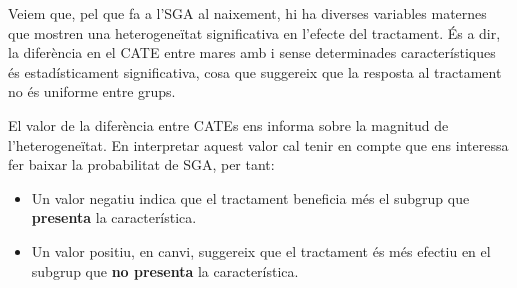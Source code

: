 \documentclass[../main.tex]{subfiles}
\begin{document}
    Veiem que, pel que fa a l’SGA al naixement, hi ha diverses variables maternes que mostren una heterogeneïtat significativa en l’efecte del tractament. És a dir, la diferència en el CATE entre mares amb i sense determinades característiques és estadísticament significativa, cosa que suggereix que la resposta al tractament no és uniforme entre grups. \par
    El valor de la diferència entre CATEs ens informa sobre la magnitud de l’heterogeneïtat. En interpretar aquest valor cal tenir en compte que ens interessa fer baixar la probabilitat de SGA, per tant:
    \begin{itemize}
        \item Un valor negatiu indica que el tractament beneficia més el subgrup que \textbf{presenta} la característica.
        \item Un valor positiu, en canvi, suggereix que el tractament és més efectiu en el subgrup que \textbf{no presenta} la característica. 
    \end{itemize}
\end{document}
